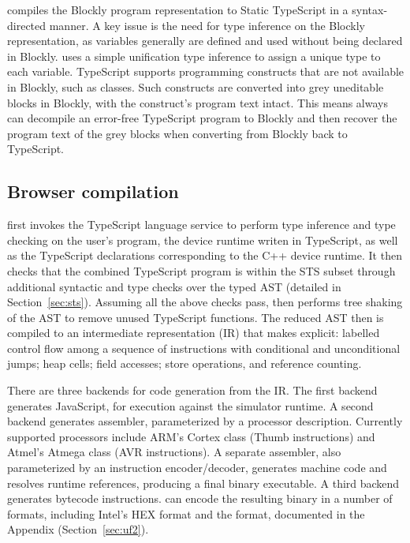 \MC compiles the Blockly program representation to Static TypeScript in a syntax-directed manner.
A key issue is the need for type inference on the Blockly representation, as variables generally are defined and used without
being declared in Blockly. \MC uses a simple unification type inference to assign a
unique type to each variable.  
TypeScript supports programming constructs that are not available in Blockly, such as classes.
Such constructs are converted into grey uneditable blocks in Blockly, with the construct's program
text intact. This means \MC always can decompile an error-free TypeScript program to Blockly and then recover
the program text of the grey blocks when converting from Blockly back to TypeScript.

\subsection{Browser compilation}

\MC first invokes the TypeScript language service to perform type inference and type checking on the 
user's program, the device runtime writen in TypeScript, as well as the TypeScript declarations
corresponding to the C++ device runtime. It then checks that the
combined TypeScript program is within the STS subset through additional syntactic and type checks over the typed AST (detailed in Section~\ref{sec:sts}).  Assuming all the
above checks pass, \MC then performs tree shaking of the AST to remove unused TypeScript functions.
The reduced AST then is compiled to an intermediate representation (IR) that makes explicit: labelled control 
flow among a sequence of instructions with conditional and unconditional jumps; heap cells; field accesses; store operations,
and reference counting.


There are three backends for code generation from the IR. The first backend generates JavaScript,
for execution against the simulator runtime.  A second backend generates assembler, parameterized by a
processor description.  Currently supported processors include ARM's Cortex class (Thumb instructions)
and Atmel's Atmega class (AVR instructions). A separate assembler, also parameterized by an instruction
encoder/decoder, generates machine code and resolves runtime references, producing a final binary executable. A third backend generates bytecode instructions.
\MC can encode the resulting binary in a number of formats, 
including Intel's HEX format and the \UF format, documented in the Appendix (Section~\ref{sec:uf2}).

